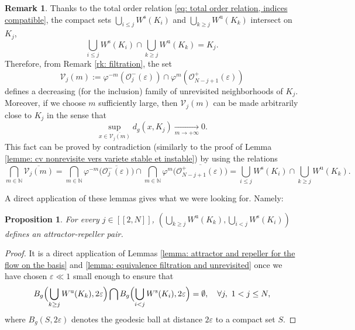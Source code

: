 \documentclass[JEP,XML,SOM,Unicode,NoEqCountersInSection,NoFloatCountersInSection,published]{cedram}
\newcommand{\lcr}{[\![}
\newcommand{\rcr}{]\!]}
\newcommand{\rs}{\mathrm{s}}
\newcommand{\ru}{\mathrm{u}}
\theoremstyle{definition}
\newtheorem{remark}[definition]{Remark}
\theoremstyle{plain}
\newtheorem{prop}[definition]{Proposition}
\newcommand{\N}{\mathbb{N}}
\newcommand{\Ocal}{\mathcal{O}}
\newcommand{\Vcal}{\mathcal{V}}
\begin{document}
\begin{remark}\label{rk: epsilon neighborhood proof below filtration}
Thanks to the total order relation \eqref{eq: total order relation, indices compatible}, the compact sets $\bigcup_{i \leq j} W^\rs (K_i)$ and $\bigcup_{k \geq j}W^\ru (K_k)$ intersect on $K_j$, \ie
\begin{equation}\label{eq: remark epsilon unrevisited neighborhoods}
\bigcup_{i \leq j}W^\rs (K_i) \cap \bigcup_{k \geq j}W^\ru (K_k) = K_j.
\end{equation}
Therefore, from Remark \ref{rk: filtration}, the set
\[
\Vcal_{j} (m):= \varphi^{-m}\left(\Ocal_j^- (\varepsilon) \right)\cap \varphi^m \left(\Ocal_{N-j+1}^+ (\varepsilon)\right)
\]
defines a decreasing (for the inclusion) family of unrevisited neighborhoods of $K_j$. Moreover, if we choose $m$ sufficiently large, then $\Vcal_j (m)$ can be made arbitrarily close to $K_j$ in the sense that
\[
\sup_{x \in \overline{\Vcal_{j} (m)}} d_g \left(x, K_j \right) \underset{m \to +\infty}{\to} 0.
\]
This fact can be proved by contradiction (similarly to the proof of Lemma \ref{lemme: cv nonrevisite vers variete stable et instable}) by using the relations
\[
\bigcap_{m \in \N} \overline{\Vcal_{j} (m)} = \bigcap_{m \in \N} \varphi^{-m}\bigl(\overline{\Ocal_j^- (\varepsilon)} \bigr) \cap \bigcap_{m \in \N} \varphi^m \bigl(\overline{\Ocal_{N-j+1}^+ (\varepsilon)}\bigr) = \bigcup_{i \leq j}W^\rs (K_i) \cap \bigcup_{k \geq j}W^\ru (K_k).
\]
\end{remark}

A direct application of these lemmas gives what we were looking for. Namely:

\begin{prop}\label{prop: attractor reppeler couple on the base}
For every $j\in\lcr2,N\rcr$, $(\bigcup_{k \geq j} W^\ru (K_k), \bigcup_{i < j}W^\rs (K_i))$ defines an attractor-repeller pair.
\end{prop}

\begin{proof}It is a direct application of Lemmas \ref{lemma: attractor and repeller for the flow on the basis} and \ref{lemma: equivalence filtration and unrevisited} once we have chosen $\varepsilon\ll 1$ small enough to ensure that
\[
B_g \Bigl(\bigcup_{k \geq j} W^\ru (K_k), 2\varepsilon \Bigr) \bigcap B_g \Bigl(\bigcup_{i < j} W^\rs (K_i), 2\varepsilon \Bigr) = \emptyset, \quad \forall j,\ 1 < j \leq N,
\]
where $B_g(S, 2\varepsilon)$ denotes the geodesic ball at distance $2\varepsilon$ to a compact set $S$.
\end{proof}
\end{document}
